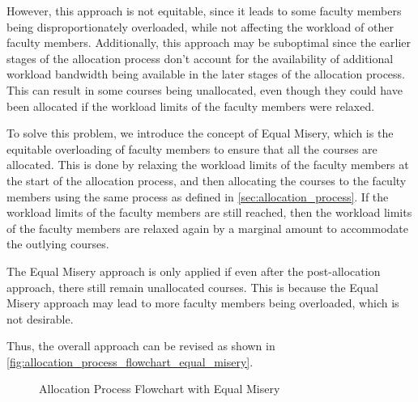 However, this approach is not equitable, since it leads to some faculty members being disproportionately overloaded, while not affecting the workload of other faculty members. Additionally, this approach may be suboptimal since the earlier stages of the allocation process don't account for the availability of additional workload bandwidth being available in the later stages of the allocation process. This can result in some courses being unallocated, even though they could have been allocated if the workload limits of the faculty members were relaxed.

To solve this problem, we introduce the concept of Equal Misery, which is the equitable overloading of faculty members to ensure that all the courses are allocated. This is done by relaxing the workload limits of the faculty members at the start of the allocation process, and then allocating the courses to the faculty members using the same process as defined in \autoref{sec:allocation_process}. If the workload limits of the faculty members are still reached, then the workload limits of the faculty members are relaxed again by a marginal amount to accommodate the outlying courses.

The Equal Misery approach is only applied if even after the post-allocation approach, there still remain unallocated courses. This is because the Equal Misery approach may lead to more faculty members being overloaded, which is not desirable.

Thus, the overall approach can be revised as shown in \autoref{fig:allocation_process_flowchart_equal_misery}.

\begin{figure}[H]
  \centering
  \caption{Allocation Process Flowchart with Equal Misery}
  \label{fig:allocation_process_flowchart_equal_misery}
\end{figure}


